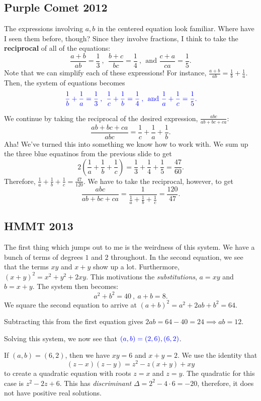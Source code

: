 \subsection{Purple Comet 2012}
The expressions involving $a,b$ in the centered equation look familiar. Where have I seen them before, though? Since they involve fractions, I think to take the \textbf{reciprocal} of all of the equations: $$\frac{a+b}{ab}=\frac13\:,\:\: \frac{b+c}{bc}=\frac14\:,\:\: \text{and } \frac{c+a}{ca}=\frac15.$$ 
Note that we can simplify each of these expressions! For instance, $\frac{a+b}{ab}=\frac{1}{b}+\frac{1}{a}$. Then, the system of equations becomes $$\color{blue}\frac{1}{b}+\frac{1}{a}=\frac13\:,\:\: \frac{1}{c}+\frac{1}{b}=\frac14\:,\:\: \text{and } \frac{1}{a}+\frac{1}{c}=\frac15.$$ 
\clearpage

We continue by taking the reciprocal of the desired expression, $\frac{abc}{ab+bc+ca}$: $$\frac{ab+bc+ca}{abc}=\frac{1}{c}+\frac{1}{a}+\frac{1}{b}.$$ Aha! We've turned this into something we know how to work with. We sum up the three blue equatinos from the previous slide to get $$2\left(\frac1a+\frac1b+\frac1c\right)=\frac13+\frac14+\frac15=\frac{47}{60}.$$ Therefore, $\displaystyle \frac1a+\frac1b+\frac1c=\frac{47}{120}$. We have to take the reciprocal, however, to get $$\frac{abc}{ab+bc+ca}=\frac{1}{\frac1a+\frac1b+\frac1c}=\boxed{\frac{120}{47}}.$$

\clearpage

\subsection{HMMT 2013}
The first thing which jumps out to me is the weirdness of this system. We have a bunch of terms of degrees $1$ and $2$ throughout. In the second equation, we see that the terms $xy$ and $x+y$ show up a lot. Furthermore, $(x+y)^2=x^2+y^2+2xy$. This motivations the \textit{substitutions}, $a=xy$ and $b=x+y$. The system then becomes: $$a^2+b^2=40\:,\: a+b=8.$$  
We square the second equation to arrive at $(a+b)^2=a^2+2ab+b^2=64$. 

Subtracting this from the first equation gives $2ab=64-40=24\implies ab=12.$

Solving this system, we now see that $\color{blue} (a,b)=(2,6), (6,2)$.
\clearpage

If $(a,b)=(6,2)$, then we have $xy=6$ and $x+y=2$. We use the identity that $$(z-x)(z-y)=z^2-z(x+y)+xy$$ to create a quadratic equation with roots $z=x$ and $z=y$. The quadratic for this case is $z^2-2z+6$. This has \textit{discriminant} $\Delta=2^2-4\cdot 6=-20$, therefore, it does not have positive real solutions.


